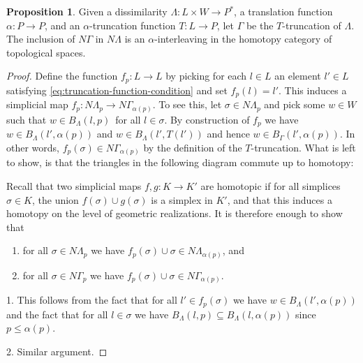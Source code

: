 \documentclass[10pt,a4paper]{article}
\theoremstyle{definition}
\newtheorem{prop}{Proposition}[thm]
\begin{document}
\begin{prop}
	Given  a dissimilarity $\Lambda\colon L\times W\to P^*$, a translation function $\alpha\colon P\to P$, and an $\alpha$-truncation function $T\colon L\to P$, let $\Gamma$ be the $T$-truncation of $\Lambda$. The inclusion of $N\Gamma$ in $N\Lambda$ is an $\alpha$-interleaving in the homotopy category of topological spaces.
\end{prop}

\begin{proof}
	Define the function $f_p\colon L\to L$ by picking for each $l\in L$ an element $l'\in L$ satisfying \cref{eq:truncation-function-condition} and set $f_p(l)=l'$. This induces a simplicial map $f_p\colon N\Lambda_p\to N\Gamma_{\alpha(p)}$. To see this, let $\sigma\in N\Lambda_p$ and pick some $w\in W$ such that $w\in B_\Lambda(l,p)$ for all $l\in\sigma$. By construction of $f_p$ we have $w\in B_\Lambda(l',\alpha(p))$ and $w\in B_\Lambda(l',T(l'))$ and hence $w\in B_\Gamma(l',\alpha(p))$. In other words, $f_p(\sigma)\in N\Gamma_{\alpha(p)}$ by the definition of the $T$-truncation. What is left to show, is that the triangles in the following diagram commute up to homotopy:
	\begin{center}
	\end{center}
	Recall that two simplicial maps $f,g\colon K\to K'$ are homotopic if for all simplices $\sigma\in K$, the union $f(\sigma)\cup g(\sigma)$ is a simplex in $K'$, and that this induces a homotopy on the level of geometric realizations. It is therefore enough to show that
	\begin{enumerate}
		\item for all $\sigma\in N\Lambda_p$ we have $f_p(\sigma)\cup\sigma\in N\Lambda_{\alpha(p)}$, and
		\item for all $\sigma\in N\Gamma_p$ we have $f_p(\sigma)\cup\sigma\in N\Gamma_{\alpha(p)}$.
	\end{enumerate}
	1. This follows from the fact that for all $l'\in f_p(\sigma)$ we have $w\in B_\Lambda(l',\alpha(p))$ and the fact that for all $l\in\sigma$ we have $B_\Lambda(l,p)\subseteq B_\Lambda(l,\alpha(p))$ since $p\leq\alpha(p)$.
	
	2. Similar argument.
\end{proof}




\printbibliography
\end{document}
